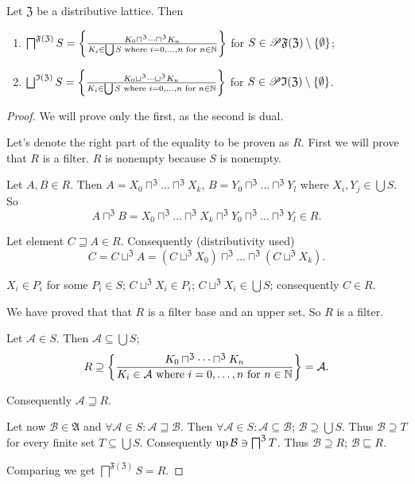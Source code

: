 \begin{thm}
Let $\mathfrak{Z}$ be a distributive lattice. Then
\begin{enumerate}
\item $\bigsqcap^{\mathfrak{F}(\mathfrak{Z})}S=\left\{ \frac{K_{0}\sqcap^{\mathfrak{Z}}\dots\sqcap^{\mathfrak{Z}}K_{n}}{K_{i}\in\bigcup S\text{ where }i=0,\dots,n\text{ for }n\in\mathbb{N}}\right\}$
for $S\in\mathscr{P}\mathfrak{F}(\mathfrak{Z})\setminus\{\emptyset\}$;
\item $\bigsqcup^{\mathfrak{I}(\mathfrak{Z})}S=\setcond{K_{0}\sqcup^{\mathfrak{Z}}\dots\sqcup^{\mathfrak{Z}}K_{n}}{K_{i}\in\bigcup S\text{ where }i=0,\dots,n\text{ for }n\in\mathbb{N}}$
for $S\in\mathscr{P}\mathfrak{I}(\mathfrak{Z})\setminus\{\emptyset\}$.
\end{enumerate}
\end{thm}
\begin{proof}
We will prove only the first, as the second is dual.

Let's denote the right part of the equality to be proven as $R$.
First we will prove that $R$ is a filter. $R$ is nonempty because
$S$ is nonempty.

Let $A,B\in R$. Then $A=X_{0}\sqcap^{\mathfrak{Z}}\dots\sqcap^{\mathfrak{Z}}X_{k}$,
$B=Y_{0}\sqcap^{\mathfrak{Z}}\dots\sqcap^{\mathfrak{Z}}Y_{l}$ where
$X_{i},Y_{j}\in\bigcup S$. So
\[
A\sqcap^{\mathfrak{Z}}B=X_{0}\sqcap^{\mathfrak{Z}}\dots\sqcap^{\mathfrak{Z}}X_{k}\sqcap^{\mathfrak{Z}}Y_{0}\sqcap^{\mathfrak{Z}}\dots\sqcap^{\mathfrak{Z}}Y_{l}\in R.
\]



Let element $C\sqsupseteq A\in R$. Consequently (distributivity used)
\[
C=C\sqcup^{\mathfrak{Z}}A=(C\sqcup^{\mathfrak{Z}}X_{0})\sqcap^{\mathfrak{Z}}\dots\sqcap^{\mathfrak{Z}}(C\sqcup^{\mathfrak{Z}}X_{k}).
\]



$X_{i}\in P_{i}$ for some $P_{i}\in S$; $C\sqcup^{\mathfrak{Z}}X_{i}\in P_{i}$;
$C\sqcup^{\mathfrak{Z}}X_{i}\in\bigcup S$; consequently $C\in R$.


We have proved that that $R$ is a filter base and an upper set. So
$R$ is a filter.


Let $\mathcal{A}\in S$. Then $\mathcal{A}\subseteq\bigcup S$;
\[
R\supseteq\left\{ \frac{K_{0}\sqcap^{\mathfrak{Z}}\dots\sqcap^{\mathfrak{Z}}K_{n}}{K_{i}\in\mathcal{A}\text{ where }i=0,\dots,n\text{ for }n\in\mathbb{N}}\right\}=\mathcal{A}.
\]



Consequently $\mathcal{A}\sqsupseteq R$.


Let now $\mathcal{B}\in\mathfrak{A}$ and $\forall\mathcal{A}\in S:\mathcal{A}\sqsupseteq\mathcal{B}$.
Then $\forall\mathcal{A}\in S:\mathcal{A}\subseteq\mathcal{B}$; $\mathcal{B}\supseteq\bigcup S$.
Thus $\mathcal{B}\supseteq T$ for every finite set $T\subseteq\bigcup S$.
Consequently $\operatorname{up}\mathcal{B}\ni\bigsqcap^{\mathfrak{Z}}T$. Thus $\mathcal{B}\supseteq R$;
$\mathcal{B}\sqsubseteq R$.


Comparing we get $\bigsqcap^{\mathfrak{F}(\mathfrak{Z})}S=R$.

\end{proof}
